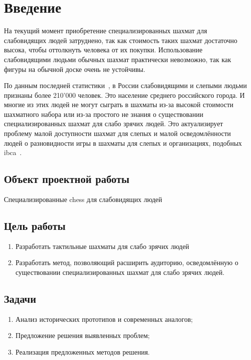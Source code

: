 \section{Введение}
На текущий момент приобретение специализированных шахмат для слабовидящих людей
затруднено, так как стоимость таких шахмат достаточно высока, чтобы оттолкнуть
человека от их покупки. Использование слабовидящими людьми обычных шахмат
практически невозможно, так как фигуры на обычной доске очень не устойчивы. 

По данным последней статистики~\cite{web:min-educ}, в России слабовидящими и
слепыми людьми признаны более 210'000 человек. Это население среднего
российского города. И многие из этих людей не могут сыграть в шахматы из-за
высокой стоимости шахматного набора или из-за простого не знания о существовании
специализированных шахмат для слабо зрячих людей. Это актуализирует проблему
малой доступности шахмат для слепых и малой осведомлённости людей о разновидности игры в
шахматы для слепых и организациях, подобных \acrshort{ibca}~\cite{web:wiki-ibca}.\@

\subsection*{Объект проектной работы}
Специализированные \gls{chess} для слабовидящих людей

\subsection*{Цель работы}
\begin{enumerate}
    \item Разработать тактильные шахматы для слабо зрячих людей
    \item Разработать метод, позволяющий расширить аудиторию, осведомлённую о
        существовании специализированных шахмат для слабо зрячих людей.
\end{enumerate}

\subsection*{Задачи}
\begin{enumerate}
    \item Анализ исторических прототипов и современных аналогов;
    \item Предложение решения выявленных проблем;
    \item Реализация предложенных методов решения.
\end{enumerate}

